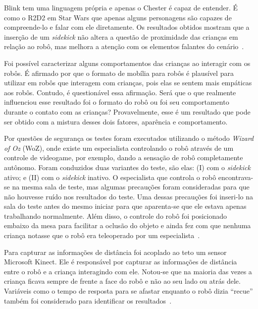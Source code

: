 Blink tem uma linguagem própria e apenas o Chester é capaz de entender. É como o R2D2 em Star Wars que apenas alguns personagens são capazes de compreende-lo e falar com ele diretamente. Os resultados obtidos mostram que a inserção de um \emph{sidekick} não altera a questão de proximidade das crianças em relação ao robô, mas melhora a atenção com os elementos falantes do cenário~\cite{vazquez:2014}.

Foi possível caracterizar alguns comportamentos das crianças ao interagir com os robôs. É afirmado por  que o formato de mobília para robôs é plausível para utilizar em robôs que interagem com crianças, pois elas se sentem mais empáticas aos robôs. Contudo, é questionável essa afirmação. Será que o que realmente influenciou esse resultado foi o formato do robô ou foi seu comportamento durante o contato com as crianças? Provavelmente, esse é um resultado que pode ser obtido com a mistura desses dois fatores, aparência e comportamento.

Por questões de segurança os testes foram executados utilizando o método \emph{Wizard of Oz} (WoZ), onde existe um especialista controlando o robô através de um controle de videogame, por exemplo, dando a sensação de robô completamente autônomo. Foram conduzidos duas variantes do teste, são elas: (I) com o \emph{sidekick} ativo; e (II) com o \emph{sidekick} inativo. O especialista que controla o robô encontrava-se na mesma sala de teste, mas algumas precauções foram consideradas para que não houvesse ruído nos resultados do teste. Uma dessas precauções foi inseri-lo na sala do teste antes do mesmo iniciar para que aparenta-se que ele estava apenas trabalhando normalmente. Além disso, o controle do robô foi posicionado embaixo da mesa para facilitar a oclusão do objeto e ainda fez com que nenhuma criança notasse que o robô era teleoperado por um especialista~\cite{vazquez:2014}.

Para capturar as informações de distância foi acoplado ao teto um sensor Microsoft Kinect. Ele é responsável por capturar as informações de distância entre o robô e a criança interagindo com ele. Notou-se que na maioria das vezes a criança ficava sempre de frente a face do robô e não ao seu lado ou atrás dele. Variáveis como o tempo de resposta para se afastar enquanto o robô dizia ``recue'' também foi considerado para identificar os resultados~\cite{vazquez:2014}.

